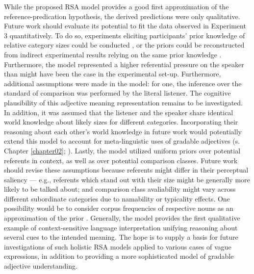 While the proposed RSA model provides a good first approximation of the reference-predication hypothesis, the derived predictions were only qualitative. Future work should evaluate its potential to fit the data observed in Experiment 3 quantitatively. To do so, experiments eliciting participants' prior knowledge of relative category sizes could be conducted \parencite{franke2016does}, or the priors could be reconstructed from indirect experimental results relying on the same prior knowledge \parencite[following][]{tessler2017warm}. Furthermore, the model represented a higher referential pressure on the speaker than might have been the case in the experimental set-up. Furthermore, additional assumptions were made in the model: for one, the inference over the standard of comparison was performed by the literal listener. The cognitive plausibility of this adjective meaning representation remains to be investigated. In addition, it was assumed that the listener and the speaker share identical world knowledge about likely sizes for different categories. Incorporating their reasoning about each other's world knowledge in future work would potentially extend this model to account for meta-linguistic uses of gradable adjectives (s. Chapter \ref{chapter02}; \textcite{barker2002dynamics}). Lastly, the model utilized uniform priors over potential referents in context, as well as over potential comparison classes. Future work should revise these assumptions because referents might differ in their perceptual saliency --- e.g., referents which stand out with their size might be generally more likely to be talked about; and comparison class avaliability might vary across different subordinate categories due to namability or typicality effects. One possibility would be to consider corpus frequencies of respective nouns as an approximation of the prior \parencite[following the model by][]{tessler2017warm}. Generally, the model provides the first qualitative example of context-sensitive language interpretation unifying reasoning about several cues to the intended meaning. The hope is to supply a basis for future investigations of such holistic RSA models applied to various cases of vague expressions, in addition to providing a more sophisticated model of gradable adjective understanding.

